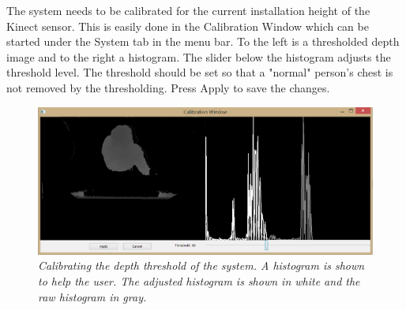 
The system needs to be calibrated for the current installation height of the Kinect sensor. This is easily done in the Calibration Window which can be started under the System tab in the menu bar. To the left is a thresholded depth image and to the right a histogram. The slider below the histogram adjusts the threshold level. The threshold should be set so that a "normal" person’s chest is not removed by the thresholding. Press Apply to save the changes. 

\begin{figure}[htb]
	\centering
	\includegraphics[width=\linewidth]{images/Calibration.png}
	\caption[Overview of the entire system]{\textit{Calibrating the depth threshold of the system. A histogram is shown to help the user. The adjusted histogram is shown in white and the raw histogram in gray.}}
	\label{fig:lowestDistanceOverFloor_calibration}  %
\end{figure}
